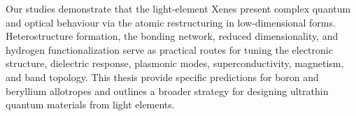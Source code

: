 Our studies demonstrate that the light-element Xenes present complex quantum and optical behaviour via the atomic restructuring in low-dimensional forms.
Heterostructure formation, the bonding network, reduced dimensionality,
and hydrogen functionalization serve as practical routes for tuning the electronic structure, dielectric response, plasmonic modes, superconductivity, magnetism, and band topology.
This thesis provide specific predictions for boron and beryllium allotropes
and outlines a broader strategy for designing ultrathin quantum materials from light elements.
